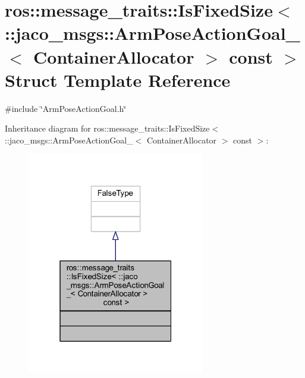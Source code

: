 \hypertarget{structros_1_1message__traits_1_1IsFixedSize_3_01_1_1jaco__msgs_1_1ArmPoseActionGoal___3_01Contai6ea5b7e7c9d1480f340bdea939ca66b5}{}\section{ros\+:\+:message\+\_\+traits\+:\+:Is\+Fixed\+Size$<$ \+:\+:jaco\+\_\+msgs\+:\+:Arm\+Pose\+Action\+Goal\+\_\+$<$ Container\+Allocator $>$ const $>$ Struct Template Reference}
\label{structros_1_1message__traits_1_1IsFixedSize_3_01_1_1jaco__msgs_1_1ArmPoseActionGoal___3_01Contai6ea5b7e7c9d1480f340bdea939ca66b5}


{\ttfamily \#include \char`\"{}Arm\+Pose\+Action\+Goal.\+h\char`\"{}}



Inheritance diagram for ros\+:\+:message\+\_\+traits\+:\+:Is\+Fixed\+Size$<$ \+:\+:jaco\+\_\+msgs\+:\+:Arm\+Pose\+Action\+Goal\+\_\+$<$ Container\+Allocator $>$ const $>$\+:
\nopagebreak
\begin{figure}[H]
\begin{center}
\leavevmode
\includegraphics[width=220pt]{da/d6b/structros_1_1message__traits_1_1IsFixedSize_3_01_1_1jaco__msgs_1_1ArmPoseActionGoal___3_01Contaibbdbdb436e225b7143b316c56d618b76}
\end{center}
\end{figure}


